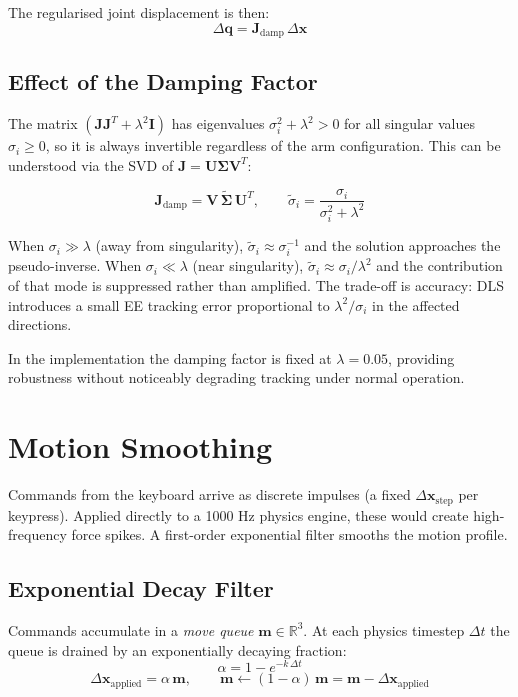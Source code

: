\documentclass[11pt, a4paper]{article}
\begin{document}
The regularised joint displacement is then:
\[
  \Delta \mathbf{q} = \mathbf{J}_{\text{damp}}\,\Delta \mathbf{x}
\]

\subsection{Effect of the Damping Factor}

The matrix $(\mathbf{J}\mathbf{J}^T + \lambda^2\mathbf{I})$ has eigenvalues $\sigma_i^2 + \lambda^2 > 0$ for all singular values $\sigma_i \geq 0$, so it is always invertible regardless of the arm configuration. This can be understood via the SVD of $\mathbf{J} = \mathbf{U}\mathbf{\Sigma}\mathbf{V}^T$:

\[
  \mathbf{J}_{\text{damp}} = \mathbf{V}\,\tilde{\mathbf{\Sigma}}\,\mathbf{U}^T, \qquad
  \tilde{\sigma}_i = \frac{\sigma_i}{\sigma_i^2 + \lambda^2}
\]

When $\sigma_i \gg \lambda$ (away from singularity), $\tilde{\sigma}_i \approx \sigma_i^{-1}$ and the solution approaches the pseudo-inverse. When $\sigma_i \ll \lambda$ (near singularity), $\tilde{\sigma}_i \approx \sigma_i / \lambda^2$ and the contribution of that mode is suppressed rather than amplified. The trade-off is accuracy: DLS introduces a small EE tracking error proportional to $\lambda^2 / \sigma_i$ in the affected directions.

In the implementation the damping factor is fixed at $\lambda = 0.05$, providing robustness without noticeably degrading tracking under normal operation.

\section{Motion Smoothing}

Commands from the keyboard arrive as discrete impulses (a fixed $\Delta \mathbf{x}_{\text{step}}$ per keypress). Applied directly to a 1000 Hz physics engine, these would create high-frequency force spikes. A first-order exponential filter smooths the motion profile.

\subsection{Exponential Decay Filter}

Commands accumulate in a \emph{move queue} $\mathbf{m} \in \mathbb{R}^3$. At each physics timestep $\Delta t$ the queue is drained by an exponentially decaying fraction:
\[
  \alpha = 1 - e^{-k\,\Delta t}
\]
\[
  \Delta \mathbf{x}_{\text{applied}} = \alpha\,\mathbf{m}, \qquad
  \mathbf{m} \leftarrow (1 - \alpha)\,\mathbf{m} = \mathbf{m} - \Delta \mathbf{x}_{\text{applied}}
\]
\end{document}
